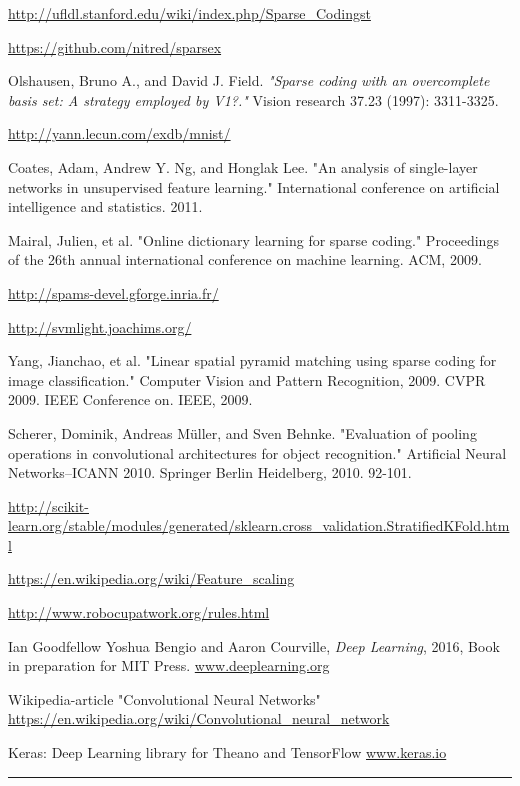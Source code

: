 \documentclass[	DIV=calc,%
				paper=a4,%
				fontsize=11pt,%
				twocolumn]{scrartcl}	 %
\newcommand{\HorRule}{\color{brsublue}%
					 \rule{\linewidth}{1pt}%
					 \color{black}
					 }
\begin{document}
\begin{thebibliography}{9}

    \url{http://ufldl.stanford.edu/wiki/index.php/Sparse\_Codingst}

    \url{https://github.com/nitred/sparsex}

Olshausen, Bruno A., and David J. Field. \textit{"Sparse coding with an overcomplete basis set: A strategy employed by V1?."} Vision research 37.23 (1997): 3311-3325.

    \url{http://yann.lecun.com/exdb/mnist/}

Coates, Adam, Andrew Y. Ng, and Honglak Lee. "An analysis of single-layer networks in unsupervised feature learning." International conference on artificial intelligence and statistics. 2011.

Mairal, Julien, et al. "Online dictionary learning for sparse coding." Proceedings of the 26th annual international conference on machine learning. ACM, 2009.

    \url{http://spams-devel.gforge.inria.fr/}

    \url{http://svmlight.joachims.org/}

Yang, Jianchao, et al. "Linear spatial pyramid matching using sparse coding for image classification." Computer Vision and Pattern Recognition, 2009. CVPR 2009. IEEE Conference on. IEEE, 2009.

Scherer, Dominik, Andreas Müller, and Sven Behnke. "Evaluation of pooling operations in convolutional architectures for object recognition." Artificial Neural Networks–ICANN 2010. Springer Berlin Heidelberg, 2010. 92-101.

    \url{http://scikit-learn.org/stable/modules/generated/sklearn.cross\_validation.StratifiedKFold.html}

    \url{https://en.wikipedia.org/wiki/Feature\_scaling}

    \url{http://www.robocupatwork.org/rules.html}

Ian Goodfellow Yoshua Bengio and Aaron Courville, \textit{Deep Learning}, 2016, Book in preparation for MIT Press. \url{www.deeplearning.org}

Wikipedia-article "Convolutional Neural Networks" \url{https://en.wikipedia.org/wiki/Convolutional_neural_network}

Keras: Deep Learning library for Theano and TensorFlow \url{www.keras.io}

\end{thebibliography}

\HorRule
\end{document}
